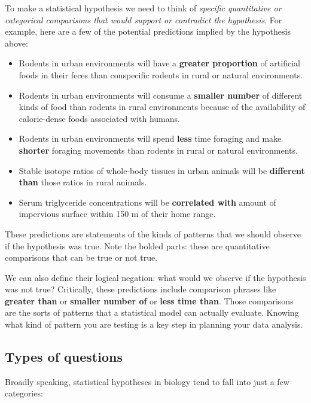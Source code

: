 \documentclass[
  13,
  letterpaper,
]{report}
\providecommand{\tightlist}{%
  \setlength{\itemsep}{0pt}\setlength{\parskip}{0pt}}
\begin{document}
To make a statistical hypothesis we need to think of \emph{specific
quantitative or categorical comparisons that would support or contradict
the hypothesis}. For example, here are a few of the potential
predictions implied by the hypothesis above:

\begin{itemize}
\tightlist
\item
  Rodents in urban environments will have a \textbf{greater proportion}
  of artificial foods in their feces than conspecific rodents in rural
  or natural environments.
\item
  Rodents in urban environments will consume a \textbf{smaller number}
  of different kinds of food than rodents in rural environments because
  of the availability of calorie-dense foods associated with humans.
\item
  Rodents in urban environments will spend \textbf{less} time foraging
  and make \textbf{shorter} foraging movements than rodents in rural or
  natural environments.
\item
  Stable isotope ratios of whole-body tissues in urban animals will be
  \textbf{different than} those ratios in rural animals.
\item
  Serum triglyceride concentrations will be \textbf{correlated with}
  amount of impervious surface within 150 m of their home range.
\end{itemize}

These predictions are statements of the kinds of patterns that we should
observe if the hypothesis was true. Note the bolded parts: these are
quantitative comparisons that can be true or not true.

We can also define their logical negation: what would we observe if the
hypothesis was not true? Critically, these predictions include
comparison phrases like \textbf{greater than} or \textbf{smaller number
of} or \textbf{less time than}. Those comparisons are the sorts of
patterns that a statistical model can actually evaluate. Knowing what
kind of pattern you are testing is a key step in planning your data
analysis.

\subsection{Types of questions}\label{sec-plan-question-types}

Broadly speaking, statistical hypotheses in biology tend to fall into
just a few categories:
\end{document}
